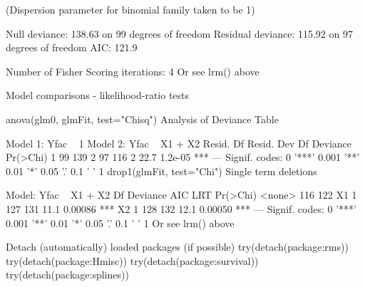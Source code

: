 (Dispersion parameter for binomial family taken to be 1)

    Null deviance: 138.63  on 99  degrees of freedom
Residual deviance: 115.92  on 97  degrees of freedom
AIC: 121.9

Number of Fisher Scoring iterations: 4
Or see lrm() above

Model comparisons - likelihood-ratio tests

anova(glm0, glmFit, test="Chisq")
Analysis of Deviance Table

Model 1: Yfac ~ 1
Model 2: Yfac ~ X1 + X2
  Resid. Df Resid. Dev Df Deviance Pr(>Chi)    
1        99        139                         
2        97        116  2     22.7  1.2e-05 ***
---
Signif. codes:  0 '***' 0.001 '**' 0.01 '*' 0.05 '.' 0.1 ' ' 1 
drop1(glmFit, test="Chi")
Single term deletions

Model:
Yfac ~ X1 + X2
       Df Deviance AIC  LRT Pr(>Chi)    
<none>         116 122                  
X1      1      127 131 11.1  0.00086 ***
X2      1      128 132 12.1  0.00050 ***
---
Signif. codes:  0 '***' 0.001 '**' 0.01 '*' 0.05 '.' 0.1 ' ' 1 
Or see lrm() above

Detach (automatically) loaded packages (if possible)
try(detach(package:rms))
try(detach(package:Hmisc))
try(detach(package:survival))
try(detach(package:splines))
